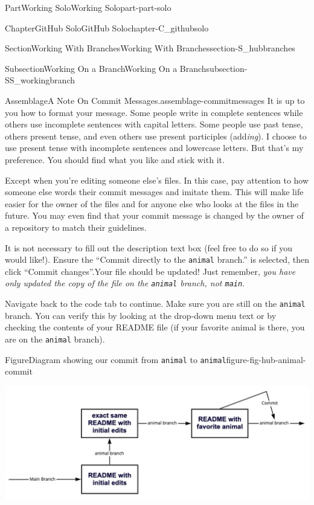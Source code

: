 \documentclass[oneside,10pt,]{book}
\newcommand{\mono}[1]{\texttt{#1}}
\begin{document}
\begin{partptx}{Part}{Working Solo}{}{Working Solo}{}{}{part-part-solo}
\begin{chapterptx}{Chapter}{GitHub Solo}{}{GitHub Solo}{}{}{chapter-C_githubsolo}
\begin{sectionptx}{Section}{Working With Branches}{}{Working With Branches}{}{}{section-S_hubbranches}
\begin{subsectionptx}{Subsection}{Working On a Branch}{}{Working On a Branch}{}{}{subsection-SS_workingbranch}
\begin{assemblage}{Assemblage}{A Note On Commit Messages.}{assemblage-commitmessages}
It is up to you how to format your message. Some people write in complete sentences while others use incomplete sentences with capital letters. Some people use past tense, others present tense, and even others use present participles (add\emph{ing}). I choose to use present tense with incomplete sentences and lowercase letters. But that's my preference. You should find what you like and stick with it.%
\par
\textellipsis{}Except when you're editing someone else's files. In this case, pay attention to how someone else words their commit messages and imitate them. This will make life easier for the owner of the files and for anyone else who looks at the files in the future. You may even find that your commit message is changed by the owner of a repository to match their guidelines.%
\end{assemblage}
It is not necessary to fill out the description text box (feel free to do so if you would like!). Ensure the ``Commit directly to the \mono{animal} branch.'' is selected, then click ``Commit changes''.Your file should be updated! Just remember, \emph{you have only updated the copy of the file on the \mono{animal} branch, not \mono{main}}.%
\par
Navigate back to the code tab to continue. Make sure you are still on the \mono{animal} branch. You can verify this by looking at the drop-down menu text or by checking the contents of your README file (if your favorite animal is there, you are on the \mono{animal} branch).%
\begin{figureptx}{Figure}{Diagram showing our commit from \mono{animal} to \mono{animal}}{figure-fig-hub-animal-commit}{}%
\begin{image}{0.05}{0.9}{0.05}{}%
\includegraphics[width=\linewidth]{external/hub_animal_commit.pdf}
\end{image}%
\tcblower
\end{figureptx}%
\end{subsectionptx}
%
%
\typeout{************************************************}

\end{sectionptx}
\end{chapterptx}
\end{partptx}
\end{document}
